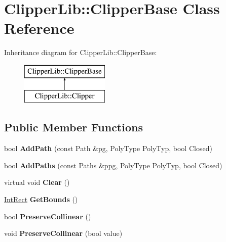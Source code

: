 \hypertarget{class_clipper_lib_1_1_clipper_base}{}\section{Clipper\+Lib\+:\+:Clipper\+Base Class Reference}
\label{class_clipper_lib_1_1_clipper_base}
Inheritance diagram for Clipper\+Lib\+:\+:Clipper\+Base\+:\begin{figure}[H]
\begin{center}
\leavevmode
\includegraphics[height=2.000000cm]{class_clipper_lib_1_1_clipper_base}
\end{center}
\end{figure}
\subsection*{Public Member Functions}
\begin{DoxyCompactItemize}
\item 
\hypertarget{class_clipper_lib_1_1_clipper_base_a7545ac6e146894dc8416887eadd01dba}{}\label{class_clipper_lib_1_1_clipper_base_a7545ac6e146894dc8416887eadd01dba} 
bool {\bfseries Add\+Path} (const Path \&pg, Poly\+Type Poly\+Typ, bool Closed)
\item 
\hypertarget{class_clipper_lib_1_1_clipper_base_a2395967b47fb9f3f5846e2bf56c18f67}{}\label{class_clipper_lib_1_1_clipper_base_a2395967b47fb9f3f5846e2bf56c18f67} 
bool {\bfseries Add\+Paths} (const Paths \&ppg, Poly\+Type Poly\+Typ, bool Closed)
\item 
\hypertarget{class_clipper_lib_1_1_clipper_base_a5690952fe8c2cb047025566405827821}{}\label{class_clipper_lib_1_1_clipper_base_a5690952fe8c2cb047025566405827821} 
virtual void {\bfseries Clear} ()
\item 
\hypertarget{class_clipper_lib_1_1_clipper_base_a5590a5454248ac3f6beeba7f9690f62e}{}\label{class_clipper_lib_1_1_clipper_base_a5590a5454248ac3f6beeba7f9690f62e} 
\hyperlink{struct_clipper_lib_1_1_int_rect}{Int\+Rect} {\bfseries Get\+Bounds} ()
\item 
\hypertarget{class_clipper_lib_1_1_clipper_base_a95c47199aeb139b13059968bc6056f44}{}\label{class_clipper_lib_1_1_clipper_base_a95c47199aeb139b13059968bc6056f44} 
bool {\bfseries Preserve\+Collinear} ()
\item 
\hypertarget{class_clipper_lib_1_1_clipper_base_aa827cfffd9be40dba7d503a3da708b91}{}\label{class_clipper_lib_1_1_clipper_base_aa827cfffd9be40dba7d503a3da708b91} 
void {\bfseries Preserve\+Collinear} (bool value)
\end{DoxyCompactItemize}
